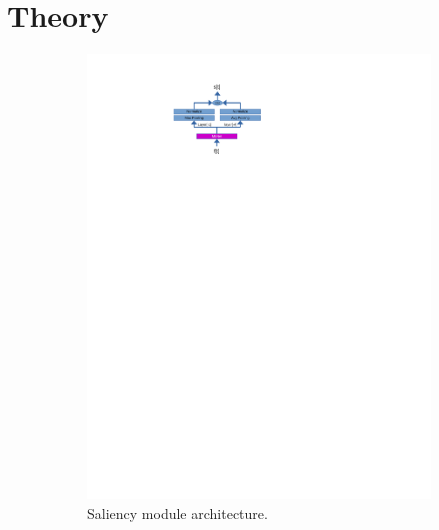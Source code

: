 \section{Theory}
\fboxsep=1mm%
\fboxrule=1pt%

\begin{figure}[h!]
	\centering
	\begin{subfigure}{0.27\linewidth}
            \includegraphics[trim=140 580 300 50, clip, width=1.\linewidth]{images/saliency.pdf}
        \caption{Saliency module architecture.}
        \label{fig:arch-saliency}
	\end{subfigure}
	\begin{subfigure}{0.7\linewidth}

\end{subfigure}
\end{figure}
